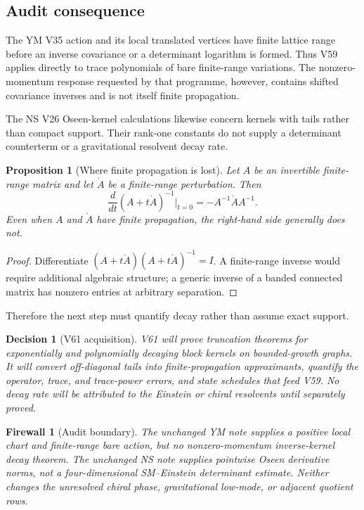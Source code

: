 \documentclass[11pt]{article}
\newtheorem{proposition}[theorem]{Proposition}
\newtheorem{firewall}[theorem]{Firewall}
\newtheorem{decision}[theorem]{Decision}
\begin{document}
\subsection{Audit consequence}

The YM V35 action and its local translated vertices have finite
lattice range before an inverse covariance or a determinant logarithm
is formed.  Thus V59 applies directly to trace polynomials of bare
finite-range variations.  The nonzero-momentum response requested by
that programme, however, contains shifted covariance inverses and is
not itself finite propagation.

The NS V26 Oseen-kernel calculations likewise concern kernels with
tails rather than compact support.  Their rank-one constants do not
supply a determinant counterterm or a gravitational resolvent decay
rate.

\begin{proposition}[Where finite propagation is lost]
\label{prop:v11v60-inverse}
Let \(A\) be an invertible finite-range matrix and let \(\dot A\) be a
finite-range perturbation.  Then
\[
                    \frac d{dt}(A+t\dot A)^{-1}\big|_{t=0}
                              =-A^{-1}\dot A A^{-1}.           \tag{60.2}
\]
Even when \(A\) and \(\dot A\) have finite propagation, the right-hand
side generally does not.
\end{proposition}

\begin{proof}
Differentiate
\((A+t\dot A)(A+t\dot A)^{-1}=I\).  A finite-range inverse would
require additional algebraic structure; a generic inverse of a
banded connected matrix has nonzero entries at arbitrary separation.
\end{proof}

Therefore the next step must quantify decay rather than assume exact
support.

\begin{decision}[V61 acquisition]
\label{dec:v11v60-next}
V61 will prove truncation theorems for exponentially and polynomially
decaying block kernels on bounded-growth graphs.  It will convert
off-diagonal tails into finite-propagation approximants, quantify the
operator, trace, and trace-power errors, and state schedules that feed
V59.  No decay rate will be attributed to the Einstein or chiral
resolvents until separately proved.
\end{decision}

\begin{firewall}[Audit boundary]
\label{fire:v11v60-boundary}
The unchanged YM note supplies a positive local chart and finite-range
bare action, but no nonzero-momentum inverse-kernel decay theorem.  The
unchanged NS note supplies pointwise Oseen derivative norms, not a
four-dimensional SM--Einstein determinant estimate.  Neither changes
the unresolved chiral phase, gravitational low-mode, or adjacent
quotient rows.
\end{firewall}
\end{document}
